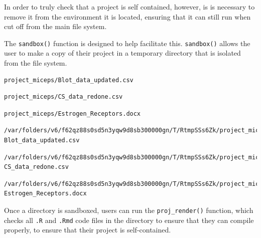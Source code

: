 \documentclass[12pt,twoside]{reedthesis}
\newenvironment{Shaded}{\begin{snugshade}}{\end{snugshade}}
\newcommand{\DecValTok}[1]{\textcolor[rgb]{0.00,0.00,0.81}{#1}}
\newcommand{\KeywordTok}[1]{\textcolor[rgb]{0.13,0.29,0.53}{\textbf{#1}}}
\newcommand{\NormalTok}[1]{#1}
\newcommand{\OperatorTok}[1]{\textcolor[rgb]{0.81,0.36,0.00}{\textbf{#1}}}
\newcommand{\StringTok}[1]{\textcolor[rgb]{0.31,0.60,0.02}{#1}}
\begin{document}
In order to truly check that a project is self contained, however, is is necessary to remove it from the environment it is located, ensuring that it can still run when cut off from the main file system.

The \texttt{sandbox()} function is designed to help facilitate this. \texttt{sandbox()} allows the user to make a copy of their project in a temporary directory that is isolated from the file system.
\begin{Shaded}
\end{Shaded}
\begin{verbatim}
project_miceps/Blot_data_updated.csv 
\end{verbatim}
\begin{verbatim}
project_miceps/CS_data_redone.csv 
\end{verbatim}
\begin{verbatim}
project_miceps/Estrogen_Receptors.docx
\end{verbatim}
\begin{Shaded}
\end{Shaded}
\begin{verbatim}
/var/folders/v6/f62qz88s0sd5n3yqw9d8sb300000gn/T/RtmpSSs6Zk/project_miceps/
Blot_data_updated.csv 
\end{verbatim}
\begin{verbatim}
/var/folders/v6/f62qz88s0sd5n3yqw9d8sb300000gn/T/RtmpSSs6Zk/project_miceps/
CS_data_redone.csv 
\end{verbatim}
\begin{verbatim}
/var/folders/v6/f62qz88s0sd5n3yqw9d8sb300000gn/T/RtmpSSs6Zk/project_miceps/
Estrogen_Receptors.docx
\end{verbatim}
Once a directory is sandboxed, users can run the \texttt{proj\_render()} function, which checks all \texttt{.R} and \texttt{.Rmd} code files in the directory to ensure that they can compile properly, to ensure that their project is self-contained.
\end{document}
